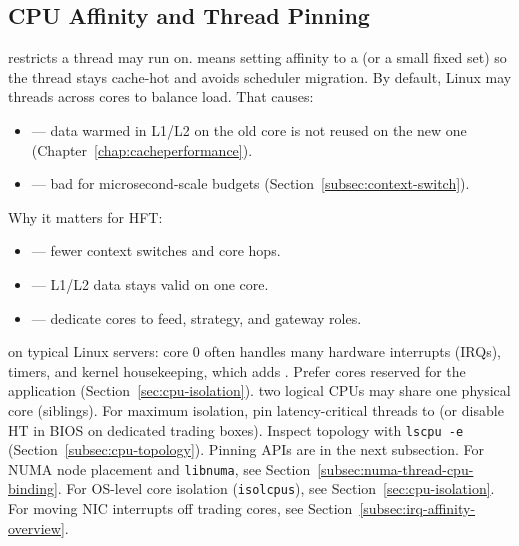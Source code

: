 \subsection{CPU Affinity and Thread Pinning}
\label{subsec:cpu-affinity-thread-pinning}
 restricts  a thread may run on. 
 means setting affinity to a  (or a small fixed set) 
so the thread stays cache-hot and avoids scheduler migration.
\newline
By default, Linux may  threads across cores to balance load. That causes:
\begin{itemize}
    \item {} --- data warmed in L1/L2 on the old core is not reused on the new one 
          (Chapter~\ref{chap:cacheperformance}).
    \item {} --- bad for microsecond-scale budgets 
          (Section~\ref{subsec:context-switch}).
\end{itemize}
Why it matters for HFT:
\begin{itemize}
    \item {} --- fewer context switches and core hops.
    \item {} --- L1/L2 data stays valid on one core.
    \item {} --- dedicate cores to feed, strategy, and gateway roles.
\end{itemize}

 on typical Linux servers: core 0 often handles many 
hardware interrupts (IRQs), timers, and kernel housekeeping, which adds . 
Prefer cores reserved for the application (Section~\ref{sec:cpu-isolation}).
\newline
{} two logical CPUs may share one physical core (siblings). 
For maximum isolation, pin latency-critical threads to  
(or disable HT in BIOS on dedicated trading boxes). Inspect topology with \texttt{lscpu -e} 
(Section~\ref{subsec:cpu-topology}).
\newline
Pinning APIs are in the next subsection. 
For NUMA node placement and \texttt{libnuma}, see Section~\ref{subsec:numa-thread-cpu-binding}. 
For OS-level core isolation (\texttt{isolcpus}), see Section~\ref{sec:cpu-isolation}. 
For moving NIC interrupts off trading cores, see Section~\ref{subsec:irq-affinity-overview}.

